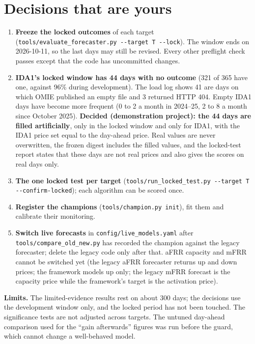\documentclass[11pt,a4paper]{article}
\newcommand{\notebox}[2]{\par\smallskip\noindent\colorbox{soft}{\parbox{\dimexpr\linewidth-2\fboxsep}{\textbf{#1} #2}}\par}
\begin{document}
\section{Decisions that are yours}

\begin{enumerate}
\item \textbf{Freeze the locked outcomes} of each target (\texttt{tools/\allowbreak evaluate\_\allowbreak forecaster.py -{}-target T -{}-lock}). The window
      ends on 2026-10-11, so the last days may still be revised. Every other preflight check passes except that the code has
      uncommitted changes.
\item \textbf{IDA1's locked window has 44 days with no outcome} (321 of 365 have one, against 96\% during development). The load log shows 41 are days on which OMIE published an empty file and 3 returned HTTP 404. Empty IDA1 days have become more frequent (0 to 2 a month in 2024--25, 2 to 8 a month since October 2025). \textbf{Decided (demonstration project): the 44 days are filled artificially}, only in the locked window and only for IDA1, with the IDA1 price set equal to the day-ahead price. Real values are never overwritten, the frozen digest includes the filled values, and the locked-test report states that these days are not real prices and also gives the scores on real days only.
\item \textbf{The one locked test per target} (\texttt{tools/\allowbreak run\_\allowbreak locked\_\allowbreak test.py -{}-target T -{}-\allowbreak confirm-locked}); each algorithm
      can be scored once.
\item \textbf{Register the champions} (\texttt{tools/champion.py init}), fit them and calibrate their monitoring.
\item \textbf{Switch live forecasts} in \texttt{config/live\_models.yaml} after \texttt{tools/compare\_old\_new.py} has recorded
      the champion against the legacy forecaster; delete the legacy code only after that. aFRR capacity and mFRR cannot be
      switched yet (the legacy aFRR forecaster returns up and down prices; the framework models up only; the legacy mFRR forecast
      is the capacity price while the framework's target is the activation price).
\end{enumerate}

\notebox{Limits.}{The limited-evidence results rest on about 300 days; the decisions use the development window only, and the
locked period has not been touched. The significance tests are not adjusted across targets. The untuned day-ahead
comparison used for the ``gain afterwards'' figures was run before the guard, which cannot change a well-behaved model.}
\end{document}
